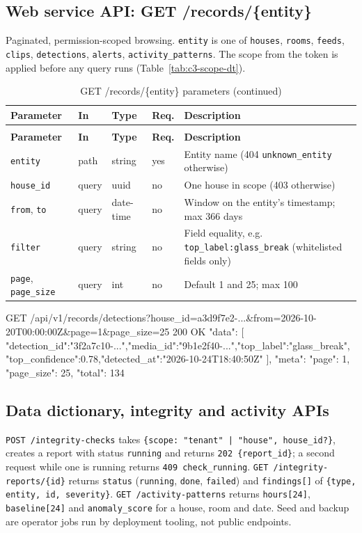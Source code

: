 \subsection{Web service API: GET /records/\{entity\}}
Paginated, permission-scoped browsing. \texttt{entity} is one of \texttt{houses}, \texttt{rooms}, \texttt{feeds},
\texttt{clips}, \texttt{detections}, \texttt{alerts}, \texttt{activity\_patterns}. The scope from the token is applied
before any query runs (Table~\ref{tab:c3-scope-dt}).
\begin{longtable}{L{2.6cm}L{1.4cm}L{1.8cm}L{1.1cm}L{7.0cm}}
\caption{GET /records/\{entity\} parameters}\\
\toprule
\textbf{Parameter} & \textbf{In} & \textbf{Type} & \textbf{Req.} & \textbf{Description} \\
\midrule
\endfirsthead
\caption[]{GET /records/\{entity\} parameters (continued)}\\
\toprule
\textbf{Parameter} & \textbf{In} & \textbf{Type} & \textbf{Req.} & \textbf{Description} \\
\midrule
\endhead
\texttt{entity} & path & string & yes & Entity name (404 \texttt{unknown\_entity} otherwise) \\
\texttt{house\_id} & query & uuid & no & One house in scope (403 otherwise) \\
\texttt{from}, \texttt{to} & query & date-time & no & Window on the entity's timestamp; max 366 days \\
\texttt{filter} & query & string & no & Field equality, e.g. \texttt{top\_label:glass\_break} (whitelisted fields only) \\
\texttt{page}, \texttt{page\_size} & query & int & no & Default 1 and 25; max 100 \\
\bottomrule
\end{longtable}
\begin{Shaded}
\begin{Code}
GET /api/v1/records/detections?house_id=a3d9f7e2-...&from=2026-10-20T00:00:00Z&page=1&page_size=25
200 OK { "data": [ {"detection_id":"3f2a7c10-...","media_id":"9b1e2f40-...","top_label":"glass_break",
                    "top_confidence":0.78,"detected_at":"2026-10-24T18:40:50Z"} ],
         "meta": { "page": 1, "page_size": 25, "total": 134 } }
\end{Code}
\end{Shaded}

\subsection{Data dictionary, integrity and activity APIs}
\texttt{POST /integrity-checks} takes \texttt{\{scope: "tenant" | "house", house\_id?\}}, creates a report with status
\texttt{running} and returns \texttt{202 \{report\_id\}}; a second request while one is running returns
\texttt{409 check\_running}. \texttt{GET /integrity-reports/\{id\}} returns \texttt{status} (\texttt{running},
\texttt{done}, \texttt{failed}) and \texttt{findings[]} of \texttt{\{type, entity, id, severity\}}.
\texttt{GET /activity-patterns} returns \texttt{hours[24]}, \texttt{baseline[24]} and \texttt{anomaly\_score} for a
house, room and date. Seed and backup are operator jobs run by deployment tooling, not public endpoints.

